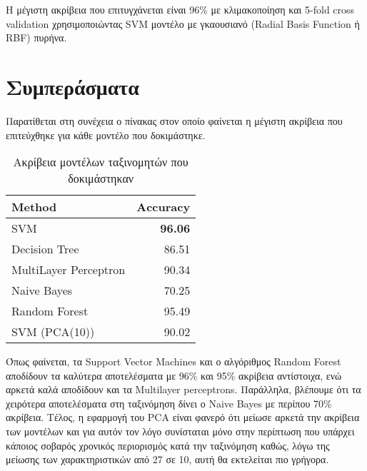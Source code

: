 Η μέγιστη ακρίβεια που επιτυγχάνεται είναι 96\% με κλιμακοποίηση και 5-fold cross validation χρησιμοποιώντας SVM μοντέλο με γκαουσιανό (Radial Basis Function ή RBF) πυρήνα.

\section{Συμπεράσματα}

Παρατίθεται στη συνέχεια ο πίνακας στον οποίο φαίνεται η μέγιστη ακρίβεια που επιτεύχθηκε για κάθε μοντέλο που δοκιμάστηκε.

\begin{table}[h]
	\centering
	\begin{tabular}{@{} l r @{}}
		\toprule
		\textbf{Method} & \textbf{Αccuracy}\\\midrule
		SVM & \textbf{96.06}   \\
		Decision Tree & 86.51 \\
		MultiLayer Perceptron & 90.34 \\
		Naive Bayes & 70.25 \\
		Random Forest & 95.49 \\
		SVM (PCA(10)) & 90.02 \\ \bottomrule
	\end{tabular}
	\caption{Ακρίβεια μοντέλων ταξινομητών που δοκιμάστηκαν}
\end{table}

Όπως φαίνεται, τα Support Vector Machines και ο αλγόριθμος Random Forest αποδίδουν τα καλύτερα αποτελέσματα με 96\% και 95\% ακρίβεια αντίστοιχα, ενώ αρκετά καλά αποδίδουν και τα Multilayer perceptrons. Παράλληλα, βλέπουμε ότι τα χειρότερα αποτελέσματα στη ταξινόμηση δίνει ο Naive Bayes με περίπου 70\% ακρίβεια. Τέλος, η εφαρμογή του PCA είναι φανερό ότι μείωσε αρκετά την ακρίβεια των μοντέλων και για αυτόν τον λόγο συνίσταται μόνο στην περίπτωση που υπάρχει κάποιος σοβαρός χρονικός περιορισμός κατά την ταξινόμηση καθώς, λόγω της μείωσης των χαρακτηριστικών από 27 σε 10, αυτή θα εκτελείται πιο γρήγορα.
